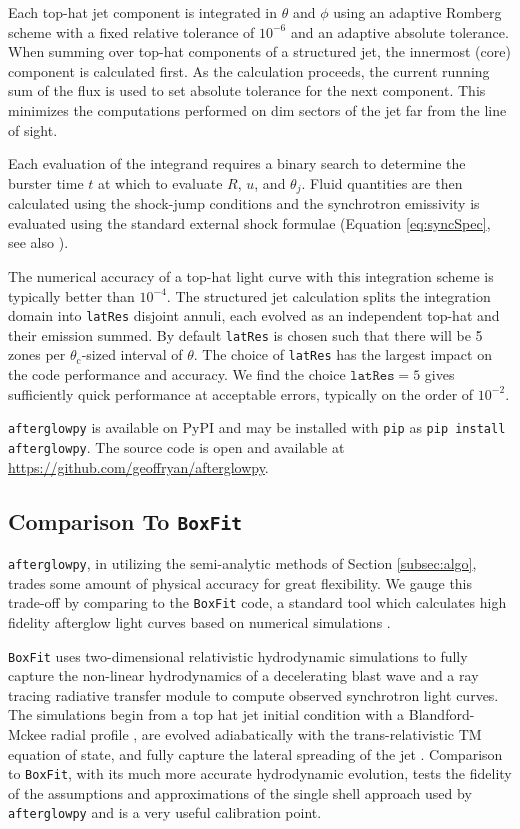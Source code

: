 \documentclass[twocolumn]{aastex62}
\newcommand{\afterglowpy}{{\tt afterglowpy}}
\newcommand{\boxfit}{{\tt BoxFit}}
\newcommand{\thC}{\ensuremath{\theta_{\mathrm{c}}}}
\begin{document}
Each top-hat jet component is integrated in $\theta$ and $\phi$ using an adaptive Romberg scheme with a fixed relative tolerance of $10^{-6}$ and an adaptive absolute tolerance.  When summing over top-hat components of a structured jet, the innermost (core) component is calculated first.  As the calculation proceeds, the current running sum of the flux is used to set absolute tolerance for the next component.  This minimizes the computations performed on dim sectors of the jet far from the line of sight.

Each evaluation of the integrand requires a binary search to determine the burster time $t$ at which to evaluate $R$, $u$, and $\theta_j$.  Fluid quantities are then calculated using the shock-jump conditions and the synchrotron emissivity is evaluated using the standard external shock formulae (Equation \eqref{eq:syncSpec}, see also \citet{Granot:2002aa,van-Eerten:2010aa}).  

The numerical accuracy of a top-hat light curve with this integration scheme is typically better than $10^{-4}$.  The structured jet calculation splits the integration domain into {\tt latRes} disjoint annuli, each evolved as an independent top-hat and their emission summed.  By default {\tt latRes} is chosen such that there will be 5 zones per $\thC$-sized interval of $\theta$.   The choice of  {\tt latRes} has the largest impact on the code performance and accuracy.  We find the choice $\mathtt{latRes} = 5$ gives sufficiently quick performance at acceptable errors, typically on the order of $10^{-2}$. 


\afterglowpy{} is available on PyPI and may be installed with {\tt pip} as {\tt pip install afterglowpy}.  The source code is open and available at \url{https://github.com/geoffryan/afterglowpy}.

\subsection{Comparison To \boxfit{}} \label{subsec:boxfitcomp}

\afterglowpy{}, in utilizing the semi-analytic methods of Section \ref{subsec:algo}, trades some amount of physical accuracy for great flexibility.  We gauge this trade-off by comparing to the \boxfit{} code, a standard tool which calculates high fidelity afterglow light curves based on numerical simulations \citep{van-Eerten:2012ab}.  

\boxfit{} uses two-dimensional relativistic hydrodynamic simulations to fully capture the non-linear hydrodynamics of a decelerating blast wave and a ray tracing radiative transfer module to compute observed synchrotron light curves.  The simulations begin from a top hat jet initial condition with a Blandford-Mckee radial profile \citep{Blandford:1976aa}, are evolved adiabatically with the trans-relativistic TM equation of state, and fully capture the lateral spreading of the jet \citep{van-Eerten:2012ab}.  Comparison to \boxfit{}, with its much more accurate hydrodynamic evolution, tests the fidelity of the assumptions and approximations of the single shell approach used by \afterglowpy{} and is a very useful calibration point.  
\end{document}

